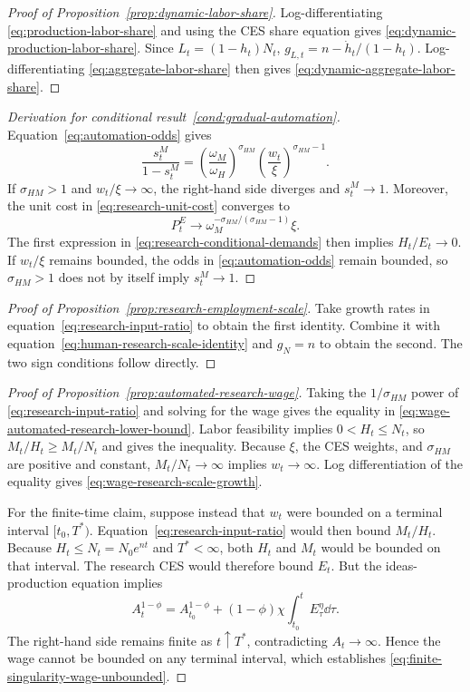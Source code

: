 \begin{proof}[Proof of Proposition~\ref{prop:dynamic-labor-share}]
Log-differentiating \eqref{eq:production-labor-share} and using the CES share
equation gives \eqref{eq:dynamic-production-labor-share}. Since
$L_t=(1-h_t)N_t$, $g_{L,t}=n-\dot h_t/(1-h_t)$.
Log-differentiating \eqref{eq:aggregate-labor-share} then gives
\eqref{eq:dynamic-aggregate-labor-share}.
\end{proof}

\begin{proof}[Derivation for conditional result~\ref{cond:gradual-automation}]
Equation~\eqref{eq:automation-odds} gives
\[
    \frac{s^M_t}{1-s^M_t}
    =
    \left(\frac{\omega_M}{\omega_H}\right)^{\sigma_{HM}}
    \left(\frac{w_t}{\xi}\right)^{\sigma_{HM}-1}.
\]
If $\sigma_{HM}>1$ and $w_t/\xi\to\infty$, the right-hand side diverges and
$s^M_t\to1$. Moreover, the unit cost in
\eqref{eq:research-unit-cost} converges to
\[
    P^E_t\longrightarrow
    \omega_M^{-\sigma_{HM}/(\sigma_{HM}-1)}\xi.
\]
The first expression in \eqref{eq:research-conditional-demands} then implies
$H_t/E_t\to0$. If $w_t/\xi$ remains bounded, the odds in
\eqref{eq:automation-odds} remain bounded, so $\sigma_{HM}>1$ does not by itself imply
$s^M_t\to1$.
\end{proof}

\begin{proof}[Proof of Proposition~\ref{prop:research-employment-scale}]
Take growth rates in equation~\eqref{eq:research-input-ratio} to obtain the first
identity. Combine it with equation~\eqref{eq:human-research-scale-identity} and
$g_N=n$ to obtain the second. The two sign conditions follow directly.
\end{proof}

\begin{proof}[Proof of Proposition~\ref{prop:automated-research-wage}]
Taking the $1/\sigma_{HM}$ power of
\eqref{eq:research-input-ratio} and solving for the wage gives the equality in
\eqref{eq:wage-automated-research-lower-bound}. Labor feasibility implies
$0<H_t\leq N_t$, so $M_t/H_t\geq M_t/N_t$ and gives the inequality. Because
$\xi$, the CES weights, and $\sigma_{HM}$ are positive and constant,
$M_t/N_t\to\infty$ implies $w_t\to\infty$. Log differentiation of the equality
gives \eqref{eq:wage-research-scale-growth}.

For the finite-time claim, suppose instead that $w_t$ were bounded on a terminal
interval $[t_0,T^*)$. Equation~\eqref{eq:research-input-ratio} would then bound
$M_t/H_t$. Because $H_t\leq N_t=N_0e^{nt}$ and $T^*<\infty$, both $H_t$ and $M_t$
would be bounded on that interval. The research CES would therefore bound $E_t$.
But the ideas-production equation implies
\[
    A_t^{1-\phi}
    =
    A_{t_0}^{1-\phi}
    +(1-\phi)\chi\int_{t_0}^{t}E_\tau^\eta\dd\tau.
\]
The right-hand side remains finite as $t\uparrow T^*$, contradicting
$A_t\to\infty$. Hence the wage cannot be bounded on any terminal interval, which
establishes \eqref{eq:finite-singularity-wage-unbounded}.
\end{proof}

